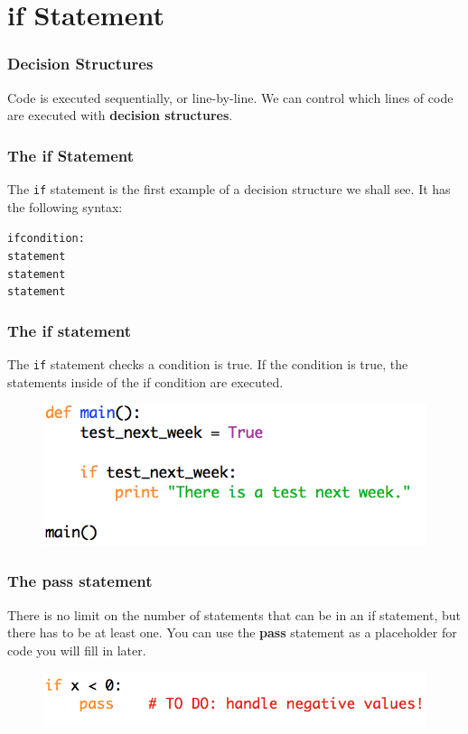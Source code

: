 \documentclass{beamer}
\begin{document}
\section{if Statement}

\begin{frame}
\frametitle{Decision Structures}

Code is executed sequentially, or line-by-line.
We can control which lines of code are executed with \textbf{decision structures}.
\end{frame}

\begin{frame}[fragile]
\frametitle{The if Statement}

The \verb|if| statement is the first example of a decision structure we shall see. It has the following syntax:
\begin{alltt}
if condition:
    statement
    statement
    statement
\end{alltt}
\end{frame}

\begin{frame}[fragile]
\frametitle{The if statement}

The \verb|if| statement checks a condition is true. If the condition is true, the statements inside of the if condition are executed.

\begin{figure}
\centering
\includegraphics[scale=0.8]{IMG/if.png}
\end{figure}
\end{frame}

\begin{frame}
\frametitle{The pass statement}

There is no limit on the number of statements that can be in an if statement, but there has to be at least one. You can use the \textbf{pass} statement as a placeholder for code you will fill in later.

\begin{figure}
\centering
\includegraphics[scale=0.8]{IMG/9.png}
\end{figure}
\end{frame}
\end{document}
